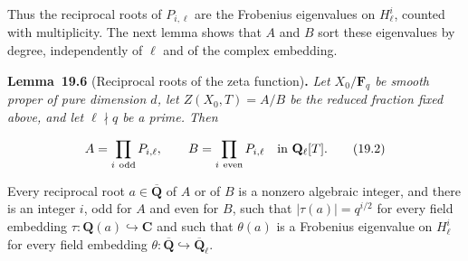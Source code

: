 \documentclass[11pt]{article}
\newenvironment{bpstatement}[2]{\par\addvspace{0.6\baselineskip}\noindent\textbf{#1}#2\textbf{.}\enspace\ignorespaces}
  {\par\addvspace{0.4\baselineskip}}
\newenvironment{bpstatementit}[2]{\begin{bpstatement}{#1}{#2}\itshape\ignorespaces}{\end{bpstatement}}
\begin{document}
\label{bp339}%
Thus the reciprocal roots of \(P_{i,\ell}\) are the Frobenius eigenvalues on \(H^i_\ell\), counted with multiplicity. The next lemma shows that \(A\) and \(B\) sort these eigenvalues by degree, independently of \(\ell\) and of the complex embedding.

\label{bp340}%
\begin{bpstatementit}{Lemma~19.6}{ (Reciprocal roots of the zeta function)}
Let \(X_0/\mathbf F_q\) be smooth proper of pure dimension \(d\), let \(Z(X_0,T)=A/B\) be the reduced fraction fixed above, and let \(\ell\nmid q\) be a prime. Then

\[
A=\prod_{i\ \mathrm{odd}}P_{i,\ell},\qquad
B=\prod_{i\ \mathrm{even}}P_{i,\ell}
\quad\hbox{in }\mathbf Q_\ell[T].
\tag{19.2}
\]

Every reciprocal root \(a\in\overline{\mathbf Q}\) of \(A\) or of \(B\) is a nonzero algebraic integer, and there is an integer \(i\), odd for \(A\) and even for \(B\), such that \(|\tau(a)|=q^{i/2}\) for every field embedding \(\tau:\mathbf Q(a)\hookrightarrow\mathbf C\) and such that \(\theta(a)\) is a Frobenius eigenvalue on \(H^i_\ell\) for every field embedding \(\theta:\overline{\mathbf Q}\hookrightarrow\overline{\mathbf Q}_\ell\).
\end{bpstatementit}
\end{document}

